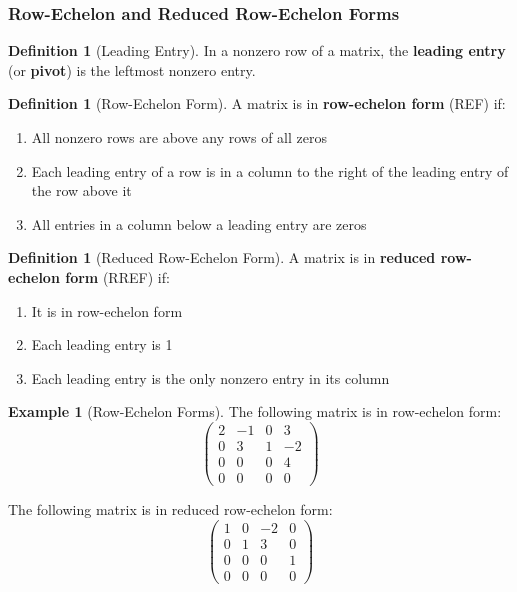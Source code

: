 \documentclass[12pt]{article}
\numberwithin{equation}{section}
\theoremstyle{plain}
\theoremstyle{definition}
\newtheorem{definition}[theorem]{Definition}
\newtheorem{example}[theorem]{Example}
\theoremstyle{remark}
\begin{document}
\subsubsection{Row-Echelon and Reduced Row-Echelon Forms}

\begin{definition}[Leading Entry]
In a nonzero row of a matrix, the \textbf{leading entry} (or \textbf{pivot}) is the leftmost nonzero entry.
\end{definition}

\begin{definition}[Row-Echelon Form]
A matrix is in \textbf{row-echelon form} (REF) if:
\begin{enumerate}
\item All nonzero rows are above any rows of all zeros
\item Each leading entry of a row is in a column to the right of the leading entry of the row above it
\item All entries in a column below a leading entry are zeros
\end{enumerate}
\end{definition}

\begin{definition}[Reduced Row-Echelon Form]  
A matrix is in \textbf{reduced row-echelon form} (RREF) if:
\begin{enumerate}
\item It is in row-echelon form
\item Each leading entry is 1
\item Each leading entry is the only nonzero entry in its column
\end{enumerate}
\end{definition}

\begin{example}[Row-Echelon Forms]
The following matrix is in row-echelon form:
$$\begin{pmatrix}
2 & -1 & 0 & 3\\
0 & 3 & 1 & -2\\
0 & 0 & 0 & 4\\
0 & 0 & 0 & 0
\end{pmatrix}$$

The following matrix is in reduced row-echelon form:
$$\begin{pmatrix}
1 & 0 & -2 & 0\\
0 & 1 & 3 & 0\\
0 & 0 & 0 & 1\\
0 & 0 & 0 & 0
\end{pmatrix}$$
\end{example}
\end{document}
